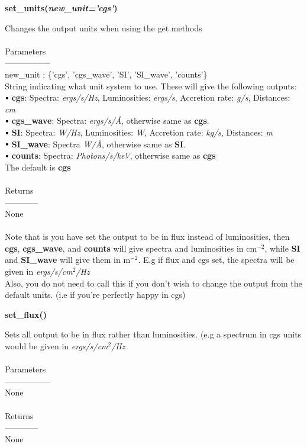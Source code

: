 \documentclass[a4paper, 11pt, times, onecolumn]{article}
\newcommand{\sbt}{\,\begin{picture}(-1,1)(-1,-3)\circle*{3}\end{picture}\ }
\begin{document}
\noindent
{\bf set\_units(\textit{new\_unit='cgs'})}
\begin{adjustwidth}{1.5cm}{}
	
	\noindent
	Changes the output units when using the get methods
	\\~\\
	Parameters\\
	-----------------\\
	\indent new\_unit : \{'cgs', 'cgs\_wave', 'SI', 'SI\_wave', 'counts'\} \\
	\indent \indent String indicating what unit system to use. These will give the following outputs: \\
	\indent \indent $\sbt$ {\bf cgs}: Spectra: {\it  ergs/s/Hz}, Luminosities: {\it ergs/s}, Accretion rate: {\it g/s}, Distances: {\it cm} \\
	\indent \indent $\sbt$ {\bf cgs\_wave}: Spectra: {\it ergs/s/\AA}, otherwise same as {\bf cgs}. \\
	\indent \indent $\sbt$ {\bf SI}: Spectra: {\it W/Hz}, Luminosities: {\it W}, Accretion rate: {\it kg/s}, Distances: {\it m} \\
	\indent \indent $\sbt$ {\bf SI\_wave}: Spectra {\it W/\AA}, otherwise same as {\bf SI}. \\
	\indent \indent $\sbt$ {\bf counts}: Spectra: {\it Photons/s/keV}, otherwise same as {\bf cgs} \\
	\indent \indent The default is {\bf cgs}
	\\~\\
	Returns \\
	------------\\ 
	\indent None 
	\\~\\
	Note that is you have set the output to be in flux instead of luminosities, then {\bf cgs}, {\bf cgs\_wave}, and {\bf counts} will give spectra and luminosities in cm$^{-2}$, while {\bf SI} and {\bf SI\_wave} will give them in m$^{-2}$. E.g if flux and cgs set, the spectra will be given in {\it ergs/s/cm$^{2}$/Hz} \\
	Also, you do not need to call this if you don't wish to change the output from the default units. (i.e if you're perfectly happy in cgs)
	
\end{adjustwidth}

\vspace{1cm}

\noindent
{\bf set\_flux()}
\begin{adjustwidth}{1.5cm}{}

	\noindent
	Sets all output to be in flux rather than luminosities. (e.g a spectrum in cgs units would be given in {\it ergs/s/cm$^{2}$/Hz}
	\\~\\
	Parameters\\
	-----------------\\
	\indent None
	\\~\\
	Returns \\
	------------\\ 
	\indent None 
	

\end{adjustwidth}
\end{document}
